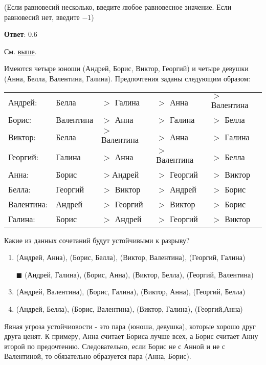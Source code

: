 	(Если равновесий несколько, введите любое равновесное значение. Если равновесий нет, введите $-1$)
	
	\textbf{Ответ}: 0.6
	
	\solution См. \hyperref[week7-models:train:solution-elections]{выше}.
	
	\task
	Имеются четыре юноши (Андрей, Борис, Виктор, Георгий) и четыре девушки (Анна, Белла, Валентина, Галина). Предпочтения заданы следующим образом:
	
	\begin{tabular}{lllll}
	\hline
	Андрей: &Белла &$>$ Галина &$>$ Анна &$>$ Валентина \\
	
	Борис: &Валентина &$>$ Анна &$>$ Галина &$>$ Белла \\
	
	Виктор: &Белла &$>$ Валентина &$>$ Анна &$>$ Галина \\
	
	Георгий: &Галина &$>$ Анна &$>$ Валентина &$>$ Белла \\
	
	Анна: &Борис &$>$Андрей &$>$ Георгий &$>$ Виктор \\
	
	Белла: &Георгий &$>$ Виктор &$>$ Андрей &$>$ Борис \\
	
	Валентина:&Андрей&$>$ Георгий &$>$ Виктор &$>$ Борис \\
	
	Галина: &Борис &$>$ Андрей &$>$ Георгий &$>$ Виктор \\
	\hline
	\end{tabular}

	Какие из данных сочетаний будут устойчивыми к разрыву?
	
	\begin{enumerate}[label=$\square$]
		\item (Андрей, Анна), (Борис, Белла), (Виктор, Валентина), (Георгий, Галина)
		\item[$\blacksquare$] (Андрей, Галина), (Борис, Анна), (Виктор, Белла), (Георгий, Валентина)
		\item (Андрей, Валентина), (Борис, Галина), (Виктор, Анна), (Георгий, Белла)
		\item (Андрей, Белла), (Борис, Валентина), (Виктор, Галина), (Георгий,Анна)
	\end{enumerate}

	\solution
	Явная угроза устойчиовости - это пара (юноша, девушка), которые хорошо друг друга ценят. К примеру, Анна считает Бориса лучше всех, а Борис считает Анну второй по предочтению. Следовательно, если Борис не с Анной и не с Валентиной, то обязательно образуется пара (Анна, Борис).
	
